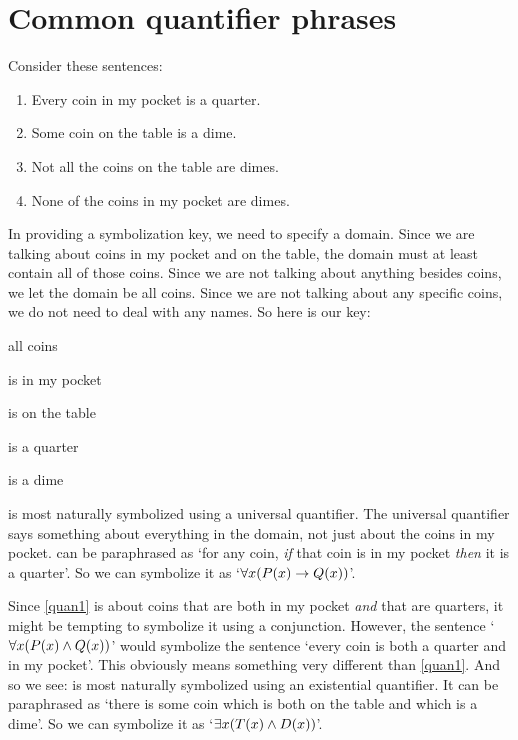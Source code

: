 

\section{Common quantifier phrases}
Consider these sentences:
	\begin{enumerate}
		\item\label{quan1} Every coin in my pocket is a quarter.
		\item\label{quan2} Some coin on the table is a dime.
		\item\label{quan3} Not all the coins on the table are dimes.
		\item\label{quan4} None of the coins in my pocket are dimes.
	\end{enumerate}
In providing a symbolization key, we need to specify a domain. Since we are talking about coins in my pocket and on the table, the domain must at least contain all of those coins. Since we are not talking about anything besides coins, we let the domain be all coins. Since we are not talking about any specific coins, we do not need to deal with any names. So here is our key:
	\begin{ekey}
		\item[\text{domain}] all coins
		\item[\atom{P}{x}]  is in my pocket
		\item[\atom{T}{x}]  is on the table
		\item[\atom{Q}{x}]  is a quarter
		\item[\atom{D}{x}]  is a dime
	\end{ekey}
 is most naturally symbolized using a universal quantifier. The universal quantifier says something about everything in the domain, not just about the coins in my pocket.  can be paraphrased as `for any coin, \emph{if} that coin is in my pocket \emph{then} it is a quarter'. So we can symbolize it as `$\forall x(P(x) \rightarrow Q(x))$'.

Since \cref*{quan1} is about coins that are both in my pocket \emph{and} that are quarters, it might be tempting to symbolize it using a conjunction. However, the sentence `$\forall x(P(x) \wedge Q(x))$' would symbolize the sentence `every coin is both a quarter and in my pocket'. This obviously means something very different than \cref*{quan1}. And so we see:
 is most naturally symbolized using an existential quantifier. It can be paraphrased as `there is some coin which is both on the table and which is a dime'. So we can symbolize it as `$\exists x(T(x) \wedge D(x))$'.

